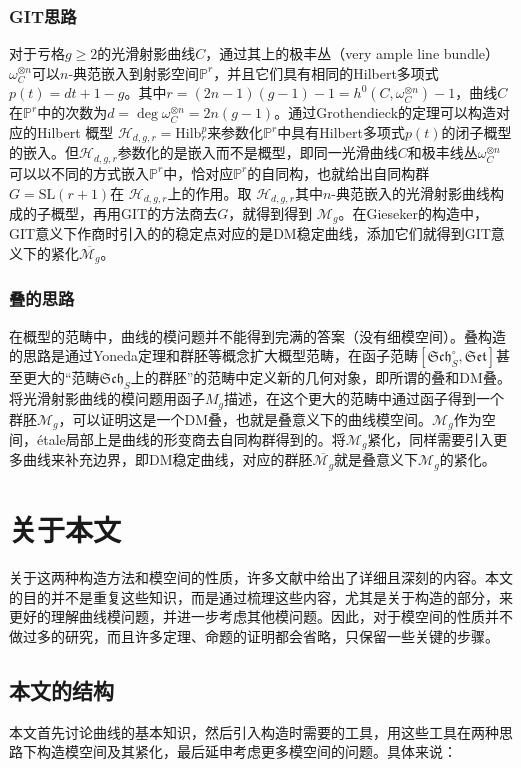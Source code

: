\subsubsection{GIT思路}
对于亏格$ g\geqslant 2 $的光滑射影曲线$ C $，通过其上的极丰丛（very ample line bundle）$ \omega_C^{\otimes n} $可以$ n $-典范嵌入到射影空间$ \mathbb{P}^r $，并且它们具有相同的Hilbert多项式$ p(t)=dt+1-g $。其中$ r=(2n-1)(g-1)-1=h^0(C,\omega_C^{\otimes n})-1 $，曲线$ C $在$ \mathbb{P}^r $中的次数为$ d=\deg \omega_C^{\otimes n}=2n(g-1) $。通过Grothendieck的定理可以构造对应的Hilbert 概型 $ \mathcal{H}_{d,g,r}=\mathrm{Hilb}_r^{p} $来参数化$ \mathbb{P}^r $中具有Hilbert多项式$ p(t) $的闭子概型的嵌入。但$ \mathcal{H}_{d,g,r} $参数化的是嵌入而不是概型，即同一光滑曲线$ C $和极丰线丛$ \omega^{\otimes n}_C $可以以不同的方式嵌入$ \mathbb{P}^r $中，恰对应$ \mathbb{P}^r $的自同构，也就给出自同构群$ G=\mathrm{SL}(r+1) $在 $ \mathcal{H}_{d,g,r} $上的作用。取 $ \mathcal{H}_{d,g,r} $其中$ n $-典范嵌入的光滑射影曲线构成的子概型，再用GIT的方法商去$ G $，就得到得到 $ \mathcal{M}_g $。在Gieseker的构造中，GIT意义下作商时引入的的稳定点对应的是DM稳定曲线，添加它们就得到GIT意义下的紧化$ \overline{\mathcal{M}_g} $。

\subsubsection{叠的思路}
在概型的范畴中，曲线的模问题并不能得到完满的答案（没有细模空间）。叠构造的思路是通过Yoneda定理和群胚等概念扩大概型范畴，在函子范畴$ [\mathfrak{Sch}_S^\circ,\mathfrak{Set}] $甚至更大的“范畴$ \mathfrak{Sch}_S $上的群胚”的范畴中定义新的几何对象，即所谓的叠和DM叠。将光滑射影曲线的模问题用函子$ M_g $描述，在这个更大的范畴中通过函子得到一个群胚$ \mathscr{M}_g $，可以证明这是一个DM叠，也就是叠意义下的曲线模空间。$ \mathscr{M}_g $作为空间，\'etale局部上是曲线的形变商去自同构群得到的。将$ \mathscr{M}_g $紧化，同样需要引入更多曲线来补充边界，即DM稳定曲线，对应的群胚$ \overline{\mathscr{M}_g} $就是叠意义下$ \mathscr{M}_g $的紧化。

\section{关于本文}
关于这两种构造方法和模空间的性质，许多文献中给出了详细且深刻的内容。本文的目的并不是重复这些知识，而是通过梳理这些内容，尤其是关于构造的部分，来更好的理解曲线模问题，并进一步考虑其他模问题。因此，对于模空间的性质并不做过多的研究，而且许多定理、命题的证明都会省略，只保留一些关键的步骤。
\subsection{本文的结构}
本文首先讨论曲线的基本知识，然后引入构造时需要的工具，用这些工具在两种思路下构造模空间及其紧化，最后延申考虑更多模空间的问题。具体来说：

